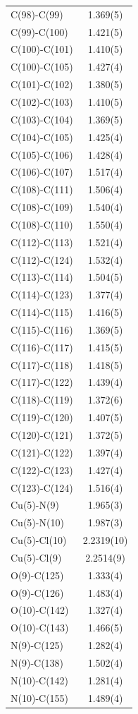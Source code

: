 \begin{center}
{\begin{supertabular}{p{1.5in}c}
C(98)-C(99) &1.369(5)\\
C(99)-C(100) &1.421(5)\\
C(100)-C(101) &1.410(5)\\
C(100)-C(105) &1.427(4)\\
C(101)-C(102) &1.380(5)\\
C(102)-C(103) &1.410(5)\\
C(103)-C(104) &1.369(5)\\
C(104)-C(105) &1.425(4)\\
C(105)-C(106) &1.428(4)\\
C(106)-C(107) &1.517(4)\\
C(108)-C(111) &1.506(4)\\
C(108)-C(109) &1.540(4)\\
C(108)-C(110) &1.550(4)\\
C(112)-C(113) &1.521(4)\\
C(112)-C(124) &1.532(4)\\
C(113)-C(114) &1.504(5)\\
C(114)-C(123) &1.377(4)\\
C(114)-C(115) &1.416(5)\\
C(115)-C(116) &1.369(5)\\
C(116)-C(117) &1.415(5)\\
C(117)-C(118) &1.418(5)\\
C(117)-C(122) &1.439(4)\\
C(118)-C(119) &1.372(6)\\
C(119)-C(120) &1.407(5)\\
C(120)-C(121) &1.372(5)\\
C(121)-C(122) &1.397(4)\\
C(122)-C(123) &1.427(4)\\
C(123)-C(124) &1.516(4)\\
Cu(5)-N(9) &1.965(3)\\
Cu(5)-N(10) &1.987(3)\\
Cu(5)-Cl(10) &2.2319(10)\\
Cu(5)-Cl(9) &2.2514(9)\\
O(9)-C(125) &1.333(4)\\
O(9)-C(126) &1.483(4)\\
O(10)-C(142) &1.327(4)\\
O(10)-C(143) &1.466(5)\\
N(9)-C(125) &1.282(4)\\
N(9)-C(138) &1.502(4)\\
N(10)-C(142) &1.281(4)\\
N(10)-C(155) &1.489(4)\\

\end{supertabular}}
\end{center}
